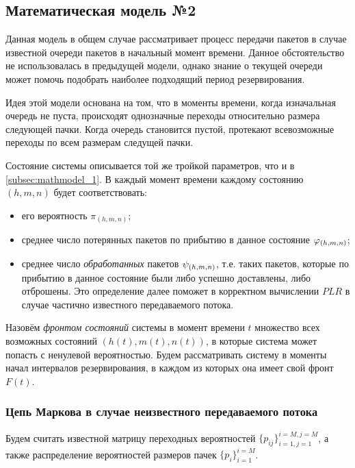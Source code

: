 \subsection{Математическая модель №2}
\label{subsec:mathmodel_2}

Данная модель в общем случае рассматривает процесс передачи пакетов в случае известной очереди пакетов в начальный момент времени. Данное обстоятельство не использовалась в предыдущей модели, однако знание о текущей очереди может помочь подобрать наиболее подходящий период резервирования.

Идея этой модели основана на том, что в моменты времени, когда изначальная очередь не пуста, происходят однозначные переходы относительно размера следующей пачки. Когда очередь становится пустой, протекают всевозможные переходы по всем размерам следущей пачки.

Состояние системы описывается той же тройкой параметров, что и в \ref{subsec:mathmodel_1}. В каждый момент времени каждому состоянию $(h, m, n)$ будет соответствовать:
\begin{itemize}
\item его вероятность $\pi_{(h, m, n)}$;
\item среднее число потерянных пакетов по прибытию в данное состояние $\varphi_{(h, m, n)}$;
\item среднее число \textit{обработанных} пакетов $\psi_{(h, m, n)}$, т.е. таких пакетов, которые по прибытию в данное состояние были либо успешно доставлены, либо отброшены. Это определение далее поможет в корректном вычислении $PLR$ в случае частично известного передаваемого потока.
\end{itemize}

Назовём \textit{фронтом состояний} системы в момент времени $t$ множество всех возможных состояний $(h(t), m(t), n(t))$, в которые система может попасть с ненулевой вероятностью. Будем рассматривать систему в моменты начал интервалов резервирования, в каждом из которых она имеет свой фронт $F(t)$.

\subsubsection{Цепь Маркова в случае неизвестного передаваемого потока}
\label{subsec:mathmodel_2_unknown}

Будем считать известной матрицу переходных вероятностей $\{ p_{ij} \}_{i=1, j=1}^{i=M, j=M}$, а также распределение вероятностей размеров пачек $\{ p_i \}_{i=1}^{i=M}$.

